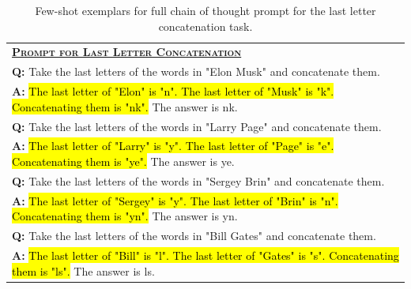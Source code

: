\documentclass[]{article}
\theoremstyle{plain}
\theoremstyle{definition}
\theoremstyle{remark}
\begin{document}
\endgroup
\begingroup
\begin{table}[H]
    \centering
    \small
    \caption{
    Few-shot exemplars for full chain of thought prompt for the last letter concatenation task.
    }
    \begin{tabular}{p{\linewidth}}
        \toprule
        \underline{\textbf{\textsc{Prompt for Last Letter Concatenation}}} \\
        \vspace{-2mm}
        \textbf{Q:} Take the last letters of the words in "Elon Musk" and concatenate them. \\
        \vspace{-1mm}
        \textbf{A:} \hl{The last letter of "Elon" is "n". The last letter of "Musk" is "k". Concatenating them is "nk".} The answer is nk. \\
         \vspace{0mm}
        \textbf{Q:} Take the last letters of the words in "Larry Page" and concatenate them. \\
        \vspace{-1mm}
        \textbf{A:} \hl{The last letter of "Larry" is "y". The last letter of "Page" is "e". Concatenating them is "ye".} The answer is ye. \\
        \vspace{0mm}
        \textbf{Q:} Take the last letters of the words in "Sergey Brin" and concatenate them. \\
        \vspace{-1mm}
        \textbf{A:} \hl{The last letter of "Sergey" is "y". The last letter of "Brin" is "n". Concatenating them is "yn".}  The answer is yn. \\
        \vspace{0mm}
        \textbf{Q:} Take the last letters of the words in "Bill Gates" and concatenate them. \\
        \vspace{-1mm}
        \textbf{A:} \hl{The last letter of "Bill" is "l". The last letter of "Gates" is "s". Concatenating them is "ls".} The answer is ls. \\
        \bottomrule
    \end{tabular}
    \label{tab:appendix-letter-concat-prompt}
\end{table}
\endgroup
\begingroup
\end{document}
